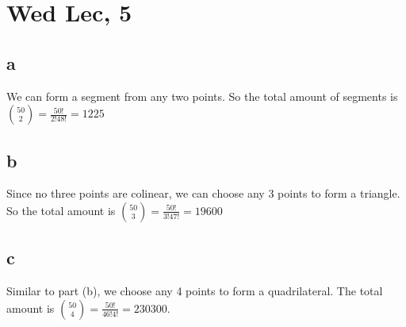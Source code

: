 \documentclass[12pt]{article}
\begin{document}
\section{Wed Lec, 5}

\subsection{a}
We can form a segment from any two points. So the total amount of segments is $\binom{50}{2} = \frac{50!}{2!48!}=1225$

\subsection{b}
Since no three points are colinear, we can choose any 3 points to form a triangle. So the total amount is $\binom{50}{3} = \frac{50!}{3!47!} = 19600$

\subsection{c}
Similar to part (b), we choose any 4 points to form a quadrilateral. The total amount is $\binom {50} {4} = \frac{50!}{46!4!} = 230300$.
\end{document}
